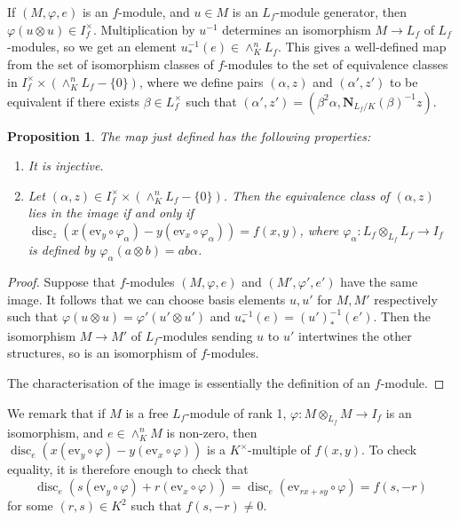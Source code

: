 \documentclass{article} %
\newtheorem{proposition}{Proposition}[section]
\numberwithin{equation}{section}
\DeclareMathOperator{\disc}{disc}
\begin{document}
If $(M, \varphi, e)$ is an $f$-module, and $u \in M$ is an $L_f$-module generator, then $\varphi(u \otimes u) \in I_f^\times$. Multiplication by $u^{-1}$ determines an isomorphism $M \to L_f$ of $L_f$-modules, so we get an element $u^{-1}_\ast(e) \in \wedge^n_K L_f$. This gives a well-defined map from the set of isomorphism classes of $f$-modules to the set of equivalence classes in $I_f^\times \times (\wedge^n_K L_f - \{ 0 \})$, where we define pairs $(\alpha, z)$ and $(\alpha', z')$ to be equivalent if there exists $\beta \in L_f^\times$ such that $(\alpha', z') = (\beta^2 \alpha, \mathbf{N}_{L_f / K}(\beta)^{-1} z)$. 
\begin{proposition}\label{prop_base_point_free_description_of_orbits} The map just defined has the following properties:
    \begin{enumerate}
        \item It is injective.
        \item Let $(\alpha, z) \in I_f^\times \times (\wedge^n_K L_f - \{ 0 \})$. Then the equivalence class of $(\alpha, z)$ lies in the image if and only if $\disc_z( x (\mathrm{ev}_y \circ \varphi_\alpha) - y (\mathrm{ev}_x \circ \varphi_\alpha) ) = f(x, y)$, where $\varphi_\alpha : L_f \otimes_{L_f} L_f \to I_f$ is defined by $\varphi_\alpha(a \otimes b) = a b \alpha$.
    \end{enumerate}
\end{proposition}
\begin{proof}
    Suppose that $f$-modules $(M, \varphi, e)$ and $(M', \varphi', e')$ have the same image. It follows that we can choose basis elements $u, u'$ for $M, M'$ respectively such that $\varphi(u \otimes u) = \varphi'(u' \otimes u')$ and $u^{-1}_\ast(e) = (u')^{-1}_\ast(e')$. Then the isomorphism $M \to M'$ of $L_f$-modules sending $u$ to $u'$ intertwines the other structures, so is an isomorphism of $f$-modules.

    The characterisation of the image is essentially the definition of an $f$-module. 
\end{proof}
We remark that if $M$ is a free $L_f$-module of rank 1, $\varphi : M \otimes_{L_f} M \to I_f$ is an isomorphism, and $e \in \wedge^n_K M$ is non-zero, then $\disc_e( x (\mathrm{ev}_y \circ \varphi) - y (\mathrm{ev}_x \circ \varphi) )$ is a $K^\times$-multiple of $f(x, y)$. To check equality, it is therefore enough to check that 
\[ \disc_e( s (\mathrm{ev}_y \circ \varphi) + r (\mathrm{ev}_x \circ \varphi) ) = \disc_e( \mathrm{ev}_{r x + s y} \circ \varphi) = f(s, -r) \]
for some $(r, s) \in K^2$ such that $f(s, -r) \neq 0$. 
\end{document}
